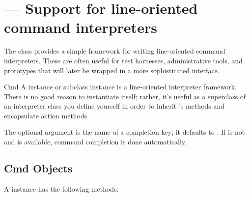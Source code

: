 \section{ ---
         Support for line-oriented command interpreters}



The  class provides a simple framework for writing
line-oriented command interpreters.  These are often useful for
test harnesses, administrative tools, and prototypes that will
later be wrapped in a more sophisticated interface.

\begin{classdesc}{Cmd}{}
A  instance or subclass instance is a line-oriented
interpreter framework.  There is no good reason to instantiate
 itself; rather, it's useful as a superclass of an
interpreter class you define yourself in order to inherit
's methods and encapsulate action methods.

The optional argument is the  name of a completion
key; it defaults to . If  is not 
and  is available, command completion is done
automatically.

\end{classdesc}

\subsection{Cmd Objects}
\label{Cmd-objects}

A  instance has the following methods:

